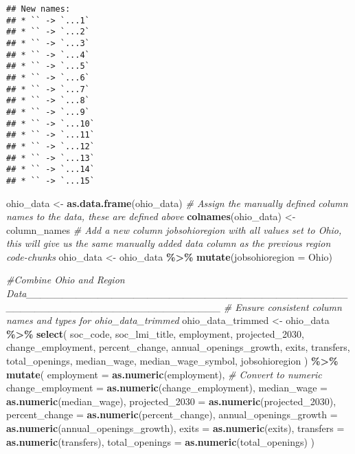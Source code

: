 \documentclass[
]{article}
\newenvironment{Shaded}{\begin{snugshade}}{\end{snugshade}}
\newcommand{\AttributeTok}[1]{\textcolor[rgb]{0.13,0.29,0.53}{#1}}
\newcommand{\CommentTok}[1]{\textcolor[rgb]{0.56,0.35,0.01}{\textit{#1}}}
\newcommand{\FunctionTok}[1]{\textcolor[rgb]{0.13,0.29,0.53}{\textbf{#1}}}
\newcommand{\NormalTok}[1]{#1}
\newcommand{\OtherTok}[1]{\textcolor[rgb]{0.56,0.35,0.01}{#1}}
\newcommand{\SpecialCharTok}[1]{\textcolor[rgb]{0.81,0.36,0.00}{\textbf{#1}}}
\newcommand{\StringTok}[1]{\textcolor[rgb]{0.31,0.60,0.02}{#1}}
\begin{document}
\begin{verbatim}
## New names:
## * `` -> `...1`
## * `` -> `...2`
## * `` -> `...3`
## * `` -> `...4`
## * `` -> `...5`
## * `` -> `...6`
## * `` -> `...7`
## * `` -> `...8`
## * `` -> `...9`
## * `` -> `...10`
## * `` -> `...11`
## * `` -> `...12`
## * `` -> `...13`
## * `` -> `...14`
## * `` -> `...15`
\end{verbatim}

\begin{Shaded}
\begin{Highlighting}[]
\NormalTok{ohio\_data }\OtherTok{\textless{}{-}} \FunctionTok{as.data.frame}\NormalTok{(ohio\_data)}
\CommentTok{\# Assign the manually defined column names to the data, these are defined above}
\FunctionTok{colnames}\NormalTok{(ohio\_data) }\OtherTok{\textless{}{-}}\NormalTok{ column\_names}
\CommentTok{\# Add a new column \textquotesingle{}jobsohioregion\textquotesingle{} with all values set to \textquotesingle{}Ohio\textquotesingle{}, this will give us the same manually added data column as the previous region code{-}chunks}
\NormalTok{ohio\_data }\OtherTok{\textless{}{-}}\NormalTok{ ohio\_data }\SpecialCharTok{\%\textgreater{}\%}
  \FunctionTok{mutate}\NormalTok{(}\AttributeTok{jobsohioregion =} \StringTok{\textquotesingle{}Ohio\textquotesingle{}}\NormalTok{)}




\CommentTok{\#Combine Ohio and Region Data\_\_\_\_\_\_\_\_\_\_\_\_\_\_\_\_\_\_\_\_\_\_\_\_\_\_\_\_\_\_\_\_\_\_\_\_\_\_\_\_\_\_\_\_\_\_\_\_\_\_\_\_\_\_\_\_\_\_\_\_\_\_\_\_\_\_\_\_\_\_\_\_\_\_\_}
\CommentTok{\# Ensure consistent column names and types for \textasciigrave{}ohio\_data\_trimmed\textasciigrave{}}
\NormalTok{ohio\_data\_trimmed }\OtherTok{\textless{}{-}}\NormalTok{ ohio\_data }\SpecialCharTok{\%\textgreater{}\%}
  \FunctionTok{select}\NormalTok{(}
\NormalTok{    soc\_code, soc\_lmi\_title, employment, projected\_2030, }
\NormalTok{    change\_employment, percent\_change, annual\_openings\_growth, }
\NormalTok{    exits, transfers, total\_openings, median\_wage, }
\NormalTok{    median\_wage\_symbol, jobsohioregion}
\NormalTok{  ) }\SpecialCharTok{\%\textgreater{}\%}
  \FunctionTok{mutate}\NormalTok{(}
    \AttributeTok{employment =} \FunctionTok{as.numeric}\NormalTok{(employment),  }\CommentTok{\# Convert to numeric}
    \AttributeTok{change\_employment =} \FunctionTok{as.numeric}\NormalTok{(change\_employment),  }
    \AttributeTok{median\_wage =} \FunctionTok{as.numeric}\NormalTok{(median\_wage), }
    \AttributeTok{projected\_2030 =} \FunctionTok{as.numeric}\NormalTok{(projected\_2030), }
    \AttributeTok{percent\_change =} \FunctionTok{as.numeric}\NormalTok{(percent\_change),}
    \AttributeTok{annual\_openings\_growth =} \FunctionTok{as.numeric}\NormalTok{(annual\_openings\_growth),}
    \AttributeTok{exits =} \FunctionTok{as.numeric}\NormalTok{(exits),}
    \AttributeTok{transfers =} \FunctionTok{as.numeric}\NormalTok{(transfers),}
    \AttributeTok{total\_openings =} \FunctionTok{as.numeric}\NormalTok{(total\_openings)}
\NormalTok{  )}
\end{Highlighting}
\end{Shaded}
\end{document}
